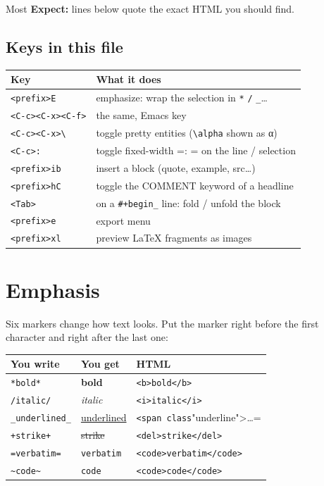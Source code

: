 Most \textbf{Expect:} lines below quote the exact HTML you should find.
\subsection{Keys in this file}
\label{sec:orga0d449c}
\begin{center}
\begin{tabular}{ll}
Key & What it does\\
\hline
\texttt{<prefix>E} & emphasize: wrap the selection in \texttt{*} \texttt{/} \texttt{\_}\ldots{}\\
\texttt{<C-c><C-x><C-f>} & the same, Emacs key\\
\texttt{<C-c><C-x>\textbackslash{}} & toggle pretty entities (\texttt{\textbackslash{}alpha} shown as α)\\
\texttt{<C-c>:} & toggle fixed-width =: = on the line / selection\\
\texttt{<prefix>ib} & insert a block (quote, example, src\ldots{})\\
\texttt{<prefix>hC} & toggle the COMMENT keyword of a headline\\
\texttt{<Tab>} & on a \texttt{\#+begin\_} line: fold / unfold the block\\
\texttt{<prefix>e} & export menu\\
\texttt{<prefix>xl} & preview \LaTeX{} fragments as images\\
\end{tabular}
\end{center}
\section{Emphasis}
\label{sec:org9627784}
Six markers change how text looks. Put the marker right before the first
character and right after the last one:

\begin{center}
\begin{tabular}{lll}
You write & You get & HTML\\
\hline
\texttt{*bold*} & \textbf{bold} & \texttt{<b>bold</b>}\\
\texttt{/italic/} & \emph{italic} & \texttt{<i>italic</i>}\\
\texttt{\_underlined\_} & \uline{underlined} & \texttt{<span class}"underline">\ldots{}=\\
\texttt{+strike+} & \sout{strike} & \texttt{<del>strike</del>}\\
\texttt{=verbatim=} & \texttt{verbatim} & \texttt{<code>verbatim</code>}\\
\texttt{\textasciitilde{}code\textasciitilde{}} & \texttt{code} & \texttt{<code>code</code>}\\
\end{tabular}
\end{center}

